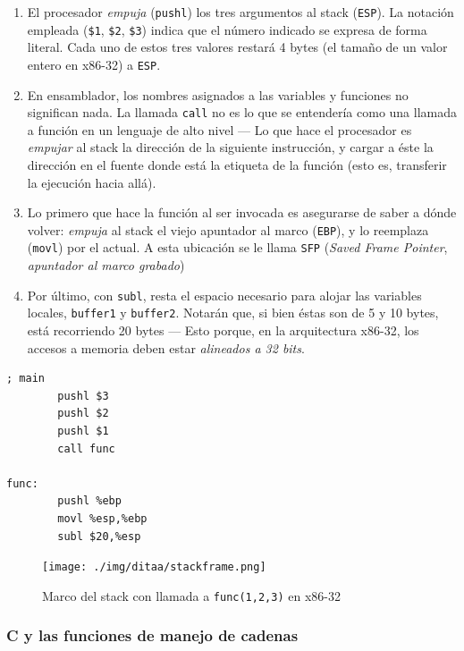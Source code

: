 \documentclass[11pt,fleqn]{book} %
\begin{document}
\begin{enumerate}
\item El procesador \emph{empuja} (\texttt{pushl}) los tres argumentos al stack
   (\texttt{ESP}). La notación empleada (\texttt{\$1}, \texttt{\$2}, \texttt{\$3}) indica que el
   número indicado se expresa de forma literal. Cada uno de estos tres
   valores restará 4 bytes (el tamaño de un valor entero en x86-32) a
   \texttt{ESP}.
\item En ensamblador, los nombres asignados a las variables y
   funciones no significan nada. La llamada \texttt{call} no es lo que
   se entendería como una llamada a función en un lenguaje de alto
   nivel — Lo que hace el procesador es \emph{empujar} al stack la dirección
   de la siguiente instrucción, y cargar a éste la dirección
   en el fuente donde está la etiqueta de la función (esto es, transferir la
   ejecución hacia allá).
\item Lo primero que hace la función al ser invocada es asegurarse de
   saber a dónde volver: \emph{empuja} al stack el viejo apuntador al marco
   (\texttt{EBP}), y lo reemplaza (\texttt{movl}) por el actual. A esta ubicación se
   le llama \texttt{SFP} (\emph{Saved Frame Pointer}, \emph{apuntador al marco    grabado})
\item Por último, con \texttt{subl}, resta el espacio necesario para alojar las
   variables locales, \texttt{buffer1} y \texttt{buffer2}. Notarán que, si bien
   éstas son de 5 y 10 bytes, está recorriendo 20 bytes — Esto
   porque, en la arquitectura x86-32, los accesos a memoria deben
   estar \emph{alineados a 32 bits}.
\end{enumerate}


\begin{verbatim}
; main
        pushl $3
        pushl $2
        pushl $1
        call func

func:
        pushl %ebp
        movl %esp,%ebp
        subl $20,%esp
\end{verbatim}

\begin{figure}[htb]
\centering
\texttt{[image: ./img/ditaa/stackframe.png]}
\caption{\label{MEM_stackframe}Marco del stack con llamada a \texttt{func(1,2,3)} en x86-32}
\end{figure}
\subsubsection{C y las funciones de manejo de cadenas}
\label{sec-5-6-1-2}
\end{document}

